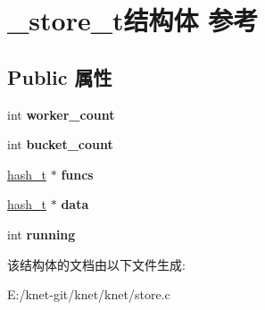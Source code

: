 \hypertarget{struct__store__t}{}\section{\+\_\+store\+\_\+t结构体 参考}
\label{struct__store__t}
\subsection*{Public 属性}
\begin{DoxyCompactItemize}
\item 
\hypertarget{struct__store__t_a0a415188636dd2047d50c081a95a83e3}{}int {\bfseries worker\+\_\+count}\label{struct__store__t_a0a415188636dd2047d50c081a95a83e3}

\item 
\hypertarget{struct__store__t_aedacf361a2ea41e8d04613446ff8ccf7}{}int {\bfseries bucket\+\_\+count}\label{struct__store__t_aedacf361a2ea41e8d04613446ff8ccf7}

\item 
\hypertarget{struct__store__t_a33bf893d1496890d7fc13963b98e344a}{}\hyperlink{struct__hash__t}{hash\+\_\+t} $\ast$ {\bfseries funcs}\label{struct__store__t_a33bf893d1496890d7fc13963b98e344a}

\item 
\hypertarget{struct__store__t_a160fc7e322a3146e8c7e6b48bec09400}{}\hyperlink{struct__hash__t}{hash\+\_\+t} $\ast$ {\bfseries data}\label{struct__store__t_a160fc7e322a3146e8c7e6b48bec09400}

\item 
\hypertarget{struct__store__t_a3e871693b6a7728a9bd0c97a145a4bae}{}int {\bfseries running}\label{struct__store__t_a3e871693b6a7728a9bd0c97a145a4bae}

\end{DoxyCompactItemize}


该结构体的文档由以下文件生成\+:\begin{DoxyCompactItemize}
\item 
E\+:/knet-\/git/knet/knet/store.\+c\end{DoxyCompactItemize}
